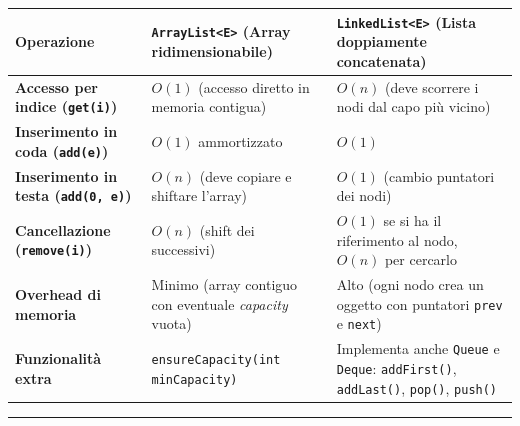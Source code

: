 \documentclass[11pt,a4paper,oneside]{report}
\newcommand{\passthrough}[1]{#1}
\begin{document}
\begin{longtable}[]{@{}
  >{\raggedright\arraybackslash}p{}
  >{\raggedright\arraybackslash}p{}
  >{\raggedright\arraybackslash}p{}@{}}
\toprule\noalign{}
\begin{minipage}[b]{\linewidth}\raggedright
Operazione
\end{minipage} & \begin{minipage}[b]{\linewidth}\raggedright
\passthrough{\lstinline!ArrayList<E>!} (Array ridimensionabile)
\end{minipage} & \begin{minipage}[b]{\linewidth}\raggedright
\passthrough{\lstinline!LinkedList<E>!} (Lista doppiamente concatenata)
\end{minipage} \\
\midrule\noalign{}
\endhead
\bottomrule\noalign{}
\endlastfoot
\textbf{Accesso per indice (\passthrough{\lstinline!get(i)!})} &
\textbf{\(O(1)\)} (accesso diretto in memoria contigua) &
\textbf{\(O(n)\)} (deve scorrere i nodi dal capo più vicino) \\
\textbf{Inserimento in coda (\passthrough{\lstinline!add(e)!})} &
\textbf{\(O(1)\)} ammortizzato & \textbf{\(O(1)\)} \\
\textbf{Inserimento in testa (\passthrough{\lstinline!add(0, e)!})} &
\textbf{\(O(n)\)} (deve copiare e shiftare l'array) & \textbf{\(O(1)\)}
(cambio puntatori dei nodi) \\
\textbf{Cancellazione (\passthrough{\lstinline!remove(i)!})} &
\textbf{\(O(n)\)} (shift dei successivi) & \textbf{\(O(1)\)} se si ha il
riferimento al nodo, \(O(n)\) per cercarlo \\
\textbf{Overhead di memoria} & Minimo (array contiguo con eventuale
\emph{capacity} vuota) & Alto (ogni nodo crea un oggetto con puntatori
\passthrough{\lstinline!prev!} e \passthrough{\lstinline!next!}) \\
\textbf{Funzionalità extra} &
\passthrough{\lstinline!ensureCapacity(int minCapacity)!} & Implementa
anche \passthrough{\lstinline!Queue!} e \passthrough{\lstinline!Deque!}:
\passthrough{\lstinline!addFirst()!},
\passthrough{\lstinline!addLast()!}, \passthrough{\lstinline!pop()!},
\passthrough{\lstinline!push()!} \\
\end{longtable}

\begin{center}\rule{0.5\linewidth}{0.5pt}\end{center}
\end{document}
